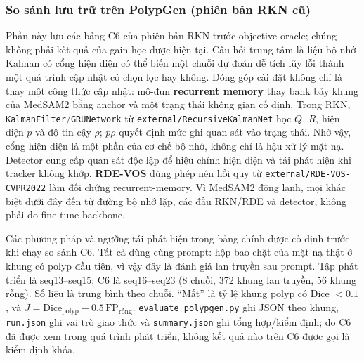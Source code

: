 \documentclass[a4paper,12pt]{report}
\begin{document}
\subsubsection{So sánh lưu trữ trên PolypGen (phiên bản RKN cũ)}

Phần này lưu các bảng C6 của phiên bản RKN trước objective oracle; chúng không phải kết quả của gain học được hiện tại. Câu hỏi trung tâm là liệu bộ nhớ Kalman có cổng hiện diện có thể biến một chuỗi dự đoán dễ tích lũy lỗi thành một quá trình cập nhật có chọn lọc hay không. Đóng góp cài đặt không chỉ là thay một công thức cập nhật: mô-đun \textbf{recurrent memory} thay bank bảy khung của MedSAM2 bằng anchor và một trạng thái không gian cố định. Trong RKN, \texttt{KalmanFilter}/\texttt{GRUNetwork} từ \texttt{external/RecursiveKalmanNet} học $Q$, $R$, hiện diện $p$ và độ tin cậy $\rho$; $p\rho$ quyết định mức ghi quan sát vào trạng thái. Nhờ vậy, cổng hiện diện là một phần của cơ chế bộ nhớ, không chỉ là hậu xử lý mặt nạ. Detector cung cấp quan sát độc lập để hiệu chỉnh hiện diện và tái phát hiện khi tracker không khớp. \textbf{RDE-VOS} dùng phép nén hồi quy từ \texttt{external/RDE-VOS-CVPR2022} làm đối chứng recurrent-memory. Vì MedSAM2 đông lạnh, mọi khác biệt dưới đây đến từ đường bộ nhớ lặp, các đầu RKN/RDE và detector, không phải do fine-tune backbone.

Các phương pháp và ngưỡng tái phát hiện trong bảng chính được cố định trước khi chạy so sánh C6. Tất cả dùng cùng prompt: hộp bao chặt của mặt nạ thật ở khung có polyp đầu tiên, vì vậy đây là đánh giá lan truyền sau prompt. Tập phát triển là seq13--seq15; C6 là seq16--seq23 (8 chuỗi, 372 khung lan truyền, 56 khung rỗng). Số liệu là trung bình theo chuỗi. ``Mất'' là tỷ lệ khung polyp có Dice $<0.1$, và $J=\mathrm{Dice}_{\text{polyp}}-0.5\,\mathrm{FP}_{\text{rỗng}}$. \texttt{evaluate\_polypgen.py} ghi JSON theo khung, \texttt{run.json} ghi vai trò giao thức và \texttt{summary.json} ghi tổng hợp/kiểm định; do C6 đã được xem trong quá trình phát triển, không kết quả nào trên C6 được gọi là kiểm định khóa.
\end{document}
